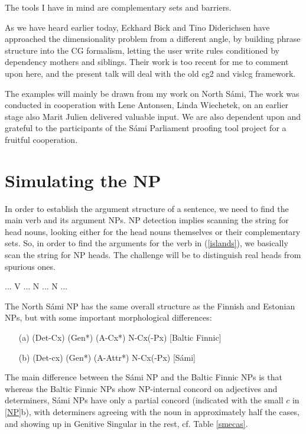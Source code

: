 \documentclass[a4paper,english]{article} %
\begin{document}
The tools I have in mind are complementary sets and barriers.%

As we have heard earlier today, Eckhard Bick and Tino Diderichsen have approached the dimensionality problem from a different angle, by building phrase structure into the CG formalism, letting the user write rules conditioned by dependency mothers and siblings. Their work is too recent for me to comment upon here, and the present talk will deal with the old cg2 and vislcg framework.%

The examples will mainly be drawn from my work on North Sámi, The work was conducted in cooperation with Lene Antonsen, Linda Wiechetek, on an earlier stage also Marit Julien delivered valuable input. We are also dependent upon and grateful to the participants of the Sámi Parliament proofing tool project for a fruitful cooperation.%

\section{Simulating the NP}

In order to establish the argument structure of a sentence, we need to find the main verb and its argument NPs. NP detection implies scanning the string for head nouns, looking either for the head nouns themselves or their complementary sets. So, in order to find the arguments for the verb in (\ref{islands}), we basically scan the string for NP heads. The challenge will be to distinguish real heads from spurious ones.%


\begin{example}\label{islands}
... V ... N ... N ...
\end{example}


The North Sámi NP has the same overall structure as the Finnish and Estonian NPs, but with some important morphological differences:%

\begin{example}\label{NP}
\begin{itemize}
\item[(a)] (Det-Cx) (Gen*) (A-Cx*) N-Cx(-Px) [Baltic Finnic]
\item[(b)] (Det-cx) (Gen*) (A-Attr*) N-Cx(-Px) [Sámi]
\end{itemize}
\end{example}

The main difference between the Sámi NP and the Baltic Finnic NPs is that whereas the Baltic Finnic NPs show NP-internal concord on adjectives and determiners, Sámi NPs have only a partial concord (indicated with the small $c$ in \ref{NP}b), with determiners agreeing with the noun in approximately half the cases, and showing up in Genitive Singular in the rest, cf. Table \ref{smecas}.%
\end{document}
